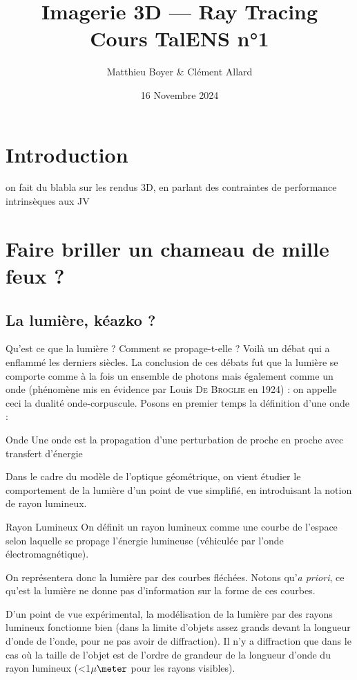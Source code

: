 \documentclass{classe}
\title{Imagerie 3D --- Ray Tracing\\ \small Cours TalENS n°1}
\author{Matthieu Boyer \& Clément Allard}
\date{16 Novembre 2024}
\begin{document}
\section*{Introduction}
on fait du blabla sur les rendus 3D, en parlant des contraintes de performance intrinsèques aux JV

\section{Faire briller un chameau de mille feux ?}
\subsection{La lumière, kéazko ?}
Qu'est ce que la lumière ? Comment se propage-t-elle ? Voilà un débat qui a enflammé les derniers siècles. La conclusion de ces débats fut que la lumière se comporte comme à la fois un ensemble de photons mais également comme un onde (phénomène mis en évidence par Louis \textsc{De Broglie} en 1924) : on appelle ceci la dualité onde-corpuscule. Posons en premier temps la définition d'une onde :
\begin{définition}{Onde}{}
Une onde est la propagation d'une perturbation de proche en proche avec transfert d'énergie
\end{définition}
Dans le cadre du modèle de l'optique géométrique, on vient étudier le comportement de la lumière d'un point de vue simplifié, en introduisant la notion de rayon lumineux.
\begin{définition}{Rayon Lumineux}{}
On définit un rayon lumineux comme une courbe de l'espace selon laquelle se propage l'énergie lumineuse (véhiculée par l'onde électromagnétique).
\end{définition}
On représentera donc la lumière par des courbes fléchées.
Notons qu'\textit{a priori}, ce qu'est la lumière ne donne pas d'information sur la forme de ces courbes.
\begin{remarque}{}{}
	D'un point de vue expérimental, la modélisation de la lumière par des rayons lumineux fonctionne bien (dans la limite d'objets assez grands devant la longueur d'onde de l'onde, pour ne pas avoir de diffraction).
	Il n'y a diffraction que dans le cas où la taille de l'objet est de l'ordre de grandeur de la longueur d'onde du rayon lumineux (<1$\mu\meter$ pour les rayons visibles).
\end{remarque}
\end{document}

